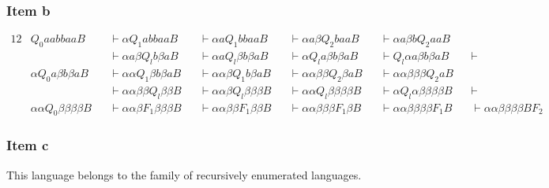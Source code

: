 {\begin{center}
\end{center}
\subsubsection{Item b}
\begin{alignat*}{12}
	& Q_0 aabbaaB &&\vdash \alpha  Q_1 abbaa B &&\vdash \alpha a Q_1 bbaa B &&\vdash \alpha a\beta  Q_2 baaB &&\vdash \alpha a\beta b Q_2 aaB \\
	&             &&\vdash \alpha a\beta  Q_l b\beta aB &&\vdash \alpha a Q_l \beta b\beta aB &&\vdash \alpha Q_l a \beta b\beta a B &&\vdash Q_l \alpha a \beta b\beta aB &&\vdash \\
	& \alpha Q_0 a \beta b\beta aB &&\vdash \alpha \alpha Q_1 \beta b\beta aB &&\vdash \alpha \alpha \beta Q_1 b\beta aB &&\vdash \alpha \alpha \beta \beta Q_2 \beta aB &&\vdash \alpha \alpha \beta \beta \beta Q_2 aB \\
	&            &&\vdash \alpha \alpha \beta \beta Q_l \beta \beta B &&\vdash \alpha \alpha \beta Q_l \beta \beta \beta B &&\vdash \alpha \alpha Q_l \beta \beta \beta \beta B &&\vdash \alpha Q_l \alpha \beta \beta \beta \beta B && \vdash \\
	& \alpha \alpha Q_0 \beta \beta \beta \beta B &&\vdash \alpha \alpha \beta F_1 \beta \beta \beta B &&\vdash \alpha \alpha \beta \beta F_1 \beta \beta B &&\vdash \alpha \alpha \beta \beta \beta F_1 \beta B &&\vdash \alpha \alpha \beta \beta \beta \beta F_1 B &&\vdash \alpha \alpha \beta \beta \beta \beta B F_2
\end{alignat*}
\subsubsection{Item c}
This language belongs to the family of recursively enumerated languages.
\pagebreak
}

